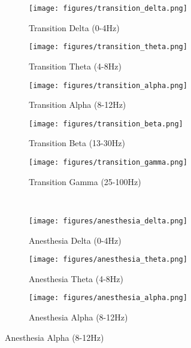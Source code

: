 \documentclass[twoside]{article}
\begin{document}
\begin{figure}[htb]
\centering
  \begin{subfigure}[b]{.19\linewidth}
    \centering
    \texttt{[image: figures/transition\_delta.png]}
    \caption{Transition \newline    Delta (0-4Hz)}\label{fig:1a}
  \end{subfigure}%
  \begin{subfigure}[b]{.19\linewidth}
    \centering
    \texttt{[image: figures/transition\_theta.png]}
    \caption{Transition \newline Theta (4-8Hz)}\label{fig:1b}
  \end{subfigure}%
  \begin{subfigure}[b]{.19\linewidth}
    \centering
    \texttt{[image: figures/transition\_alpha.png]}
    \caption{Transition \newline Alpha (8-12Hz)}\label{fig:1c}
  \end{subfigure}%
  \begin{subfigure}[b]{.19\linewidth}
    \centering
    \texttt{[image: figures/transition\_beta.png]}
    \caption{Transition \newline   Beta (13-30Hz)}\label{fig:1d}
  \end{subfigure}%
  \begin{subfigure}[b]{.19\linewidth}
    \centering
    \texttt{[image: figures/transition\_gamma.png]}
    \caption{Transition \newline  Gamma (25-100Hz)}\label{fig:1e}
  \end{subfigure}\\%
  \begin{subfigure}[b]{.19\linewidth}
    \centering
    \texttt{[image: figures/anesthesia\_delta.png]}
    \caption{Anesthesia \newline Delta (0-4Hz)}\label{fig:1f}
  \end{subfigure}%
  \begin{subfigure}[b]{.19\linewidth}
    \centering
    \texttt{[image: figures/anesthesia\_theta.png]}
    \caption{Anesthesia \newline Theta (4-8Hz)}\label{fig:1g}
  \end{subfigure}%
  \begin{subfigure}[b]{.19\linewidth}
    \centering
    \texttt{[image: figures/anesthesia\_alpha.png]}
    \caption{Anesthesia \newline Alpha (8-12Hz)}\label{fig:1h}

\end{subfigure}
\end{figure}
\end{document}
